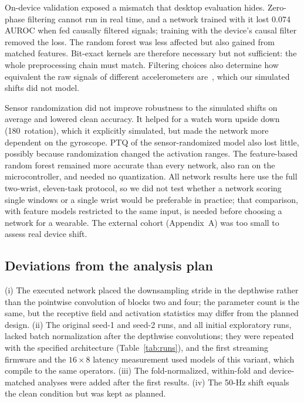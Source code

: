 \documentclass[preprint,12pt]{elsarticle}
\begin{document}
On-device validation exposed a mismatch that desktop evaluation hides. Zero-phase filtering cannot run in real time, and a network trained with it lost 0.074 AUROC when fed causally filtered signals; training with the device's causal filter removed the loss. The random forest was less affected but also gained from matched features. Bit-exact kernels are therefore necessary but not sufficient: the whole preprocessing chain must match. Filtering choices also determine how equivalent the raw signals of different accelerometers are~\cite{CoyleAsbil2026}, which our simulated shifts did not model.

Sensor randomization did not improve robustness to the simulated shifts on average and lowered clean accuracy. It helped for a watch worn upside down (180\textdegree\ rotation), which it explicitly simulated, but made the network more dependent on the gyroscope. PTQ of the sensor-randomized model also lost little, possibly because randomization changed the activation ranges. The feature-based random forest remained more accurate than every network, also ran on the microcontroller, and needed no quantization. All network results here use the full two-wrist, eleven-task protocol, so we did not test whether a network scoring single windows or a single wrist would be preferable in practice; that comparison, with feature models restricted to the same input, is needed before choosing a network for a wearable. The external cohort (Appendix~A) was too small to assess real device shift.

\subsection{Deviations from the analysis plan}
\label{sec:dev}
(i) The executed network placed the downsampling stride in the depthwise rather than the pointwise convolution of blocks two and four; the parameter count is the same, but the receptive field and activation statistics may differ from the planned design. (ii) The original seed-1 and seed-2 runs, and all initial exploratory runs, lacked batch normalization after the depthwise convolutions; they were repeated with the specified architecture (Table~\ref{tab:runs}), and the first streaming firmware and the $16\times8$ latency measurement used models of this variant, which compile to the same operators. (iii) The fold-normalized, within-fold and device-matched analyses were added after the first results. (iv) The 50-Hz shift equals the clean condition but was kept as planned.
\end{document}
